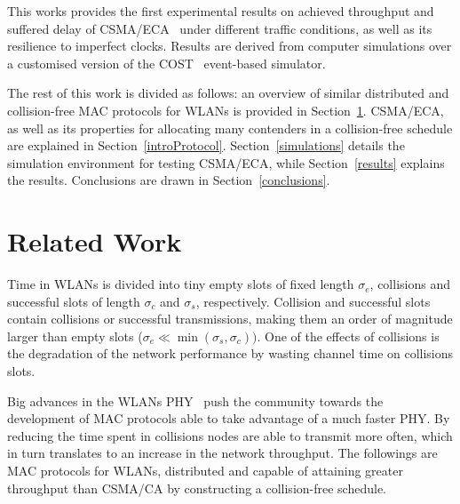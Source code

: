 \documentclass[a4paper,journal]{IEEEtran}
\begin{document}
This works provides the first experimental results on achieved throughput and suffered delay of CSMA/ECA~\cite{research2standards} under different traffic conditions, as well as its resilience to imperfect clocks. Results are derived from computer simulations over a customised version of the COST~\cite{COST} event-based simulator.


The rest of this work is divided as follows: an overview of similar distributed and collision-free MAC protocols for WLANs is provided in  Section~\ref{relatedWork}. CSMA/ECA, as well as its properties for allocating many contenders in a collision-free schedule are explained in Section~\ref{introProtocol}. Section~\ref{simulations} details the simulation environment for testing CSMA/ECA, while Section~\ref{results} explains the results. Conclusions are drawn in Section~\ref{conclusions}.




\section{Related Work}\label{relatedWork}
Time in WLANs is divided into tiny empty slots of fixed length $\sigma_{e}$, collisions and successful slots of length $\sigma_{c}$ and $\sigma_{s}$, respectively. Collision and successful slots contain collisions or successful transmissions, making them an order of magnitude larger than empty slots ($\sigma_{e}\ll\min(\sigma_{s},\sigma_{c}))$. One of the effects of collisions is the degradation of the network performance by wasting channel time on collisions slots. 

Big advances in the WLANs PHY~\cite{perahia2008ieee,6191306} push the community towards the development of MAC protocols able to take advantage of a much faster PHY. By reducing the time spent in collisions nodes are able to transmit more often, which in turn translates to an increase in the network throughput. The followings are MAC protocols for WLANs, distributed and capable of attaining greater throughput than CSMA/CA by constructing a collision-free schedule.
\end{document}
